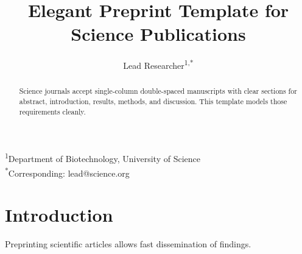 \documentclass[11pt]{article}
\title{\bfseries Elegant Preprint Template for Science Publications}
\author{Lead Researcher\textsuperscript{1,*}}
\date{}
\begin{document}
\maketitle

\noindent \textsuperscript{1}Department of Biotechnology, University of Science \\
\noindent \textsuperscript{*}Corresponding: lead@science.org

\begin{abstract}
Science journals accept single-column double-spaced manuscripts with clear sections for abstract, introduction, results, methods, and discussion. This template models those requirements cleanly.
\end{abstract}

\section{Introduction}
Preprinting scientific articles allows fast dissemination of findings.
\end{document}
